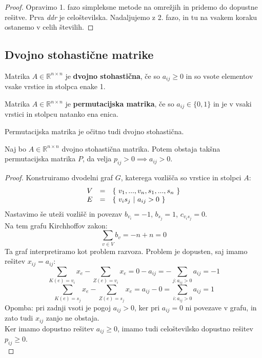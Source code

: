\documentclass[11pt, a4paper]{article}
\begin{document}
    \begin{proof}
        Opravimo 1. fazo simpleksne metode na omrežjih in pridemo do dopustne rešitve. Prva \textit{ddr} je celoštevilska. Nadaljujemo z 2. fazo, in tu na vsakem koraku ostanemo v celih številih.
    \end{proof}


    \subsection{Dvojno stohastične matrike}


    \begin{definition}
        Matrika \(A \in \mathbb{R}^{n \times n}\) je \textbf{dvojno stohastična}, če so \(a_{ij} \ge 0\) in so vsote elementov vsake vrstice in stolpca enake 1.
    \end{definition}

    \begin{definition}
        Matrika \(A \in \mathbb{R}^{n \times n}\) je \textbf{permutacijska matrika}, če so \(a_{ij} \in \{0,1\}\) in je v vsaki vrstici in stolpcu natanko ena enica.
    \end{definition}

    Permutacijska matrika je očitno tudi dvojno stohastična.

    \begin{proposition}
        Naj bo \(A \in \mathbb{R}^{n \times n}\) dvojno stohastična matrika. Potem obstaja takšna permutacijska matrika \(P\), da velja \(p_{ij} > 0 \implies a_{ij} > 0\).
    \end{proposition}

    \begin{proof}
        Konstruiramo dvodelni graf \(G\), katerega vozlišča so vrstice in stolpci \(A\):
        \[
            \begin{array}{l l l}
                V & = & \{\ v_1,...,v_n,s_1,...,s_n\ \} \\
                E & = & \{\ v_i s_j\ |\ a_{ij} > 0\ \}
            \end{array}
        \]
        Nastavimo še uteži vozlišč in povezav \(b_{v_i}=-1\), \(b_{s_j}=1\), \(c_{v_i s_j}=0\). \\
        Na tem grafu Kirchhoffov zakon:
        \[
            \sum_{v \in V} b_v = -n + n = 0    
        \]
        Ta graf interpretiramo kot problem razvoza. Problem je dopusten, saj imamo rešitev \(x_{ij}=a_{ij}\):
        \[
            \sum_{K(e)=v_i} x_e - \sum_{Z(e)=v_i} x_e = 0 - a_{ij} = - \sum_{j:a_{ij}>0} a_{ij} = -1
        \]
        \[
            \sum_{K(e)=s_j} x_e - \sum_{Z(e)=s_j} x_e = a_{ij} - 0 = \sum_{i:a_{ij}>0} a_{ij} = 1
        \]
        Opomba: pri zadnji vsoti je pogoj \(a_{ij} > 0\), ker pri \(a_{ij}=0\) ni povezave v grafu, in zato tudi \(x_{ij}\) zanjo ne obstaja. \\
        Ker imamo dopustno rešitev \(a_{ij} \ge 0\), imamo tudi celoštevilsko dopustno rešitev \(p_{ij} \ge 0\). \\
        
    \end{proof}
\end{document}
